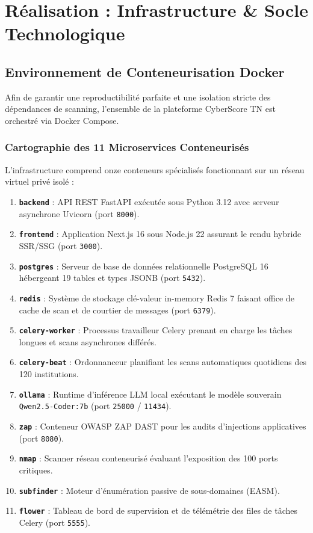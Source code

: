 \chapter[Infrastructure \& Socle Technique]{Réalisation : Infrastructure \& Socle Technologique}
\label{chap:infra}

\section{Environnement de Conteneurisation Docker}
Afin de garantir une reproductibilité parfaite et une isolation stricte des dépendances de scanning, l'ensemble de la plateforme CyberScore TN est orchestré via Docker Compose.

\subsection{Cartographie des 11 Microservices Conteneurisés}
L'infrastructure comprend onze conteneurs spécialisés fonctionnant sur un réseau virtuel privé isolé :
\begin{enumerate}
    \item \textbf{\texttt{backend}} : API REST FastAPI exécutée sous Python 3.12 avec serveur asynchrone Uvicorn (port \texttt{8000}).
    \item \textbf{\texttt{frontend}} : Application Next.js 16 sous Node.js 22 assurant le rendu hybride SSR/SSG (port \texttt{3000}).
    \item \textbf{\texttt{postgres}} : Serveur de base de données relationnelle PostgreSQL 16 hébergeant 19 tables et types JSONB (port \texttt{5432}).
    \item \textbf{\texttt{redis}} : Système de stockage clé-valeur in-memory Redis 7 faisant office de cache de scan et de courtier de messages (port \texttt{6379}).
    \item \textbf{\texttt{celery-worker}} : Processus travailleur Celery prenant en charge les tâches longues et scans asynchrones différés.
    \item \textbf{\texttt{celery-beat}} : Ordonnanceur planifiant les scans automatiques quotidiens des 120 institutions.
    \item \textbf{\texttt{ollama}} : Runtime d'inférence LLM local exécutant le modèle souverain \texttt{Qwen2.5-Coder:7b} (port \texttt{25000} / \texttt{11434}).
    \item \textbf{\texttt{zap}} : Conteneur OWASP ZAP DAST pour les audits d'injections applicatives (port \texttt{8080}).
    \item \textbf{\texttt{nmap}} : Scanner réseau conteneurisé évaluant l'exposition des 100 ports critiques.
    \item \textbf{\texttt{subfinder}} : Moteur d'énumération passive de sous-domaines (EASM).
    \item \textbf{\texttt{flower}} : Tableau de bord de supervision et de télémétrie des files de tâches Celery (port \texttt{5555}).
\end{enumerate}

